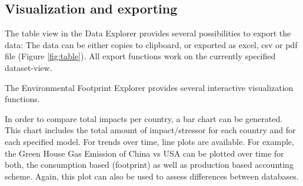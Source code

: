 \subsection{Visualization and exporting}

The table view in the Data Explorer provides several possibilities to export the data: The data can be either copies to clipboard, or exported as excel, csv or pdf file (Figure \ref{fig:table}). All export functions work on the currently specified dataset-view. 

The Environmental Footprint Explorer provides several interactive visualization functions. 

In order to compare total impacts per country, a bar chart can be generated. This chart includes the total amount of impact/stressor for each country and for each specified model. For trends over time, line plots are available. 
For example, the Green House Gas Emission of China vs USA can be plotted over time for both, the consumption based (footprint) as well as production based accounting scheme. Again, this plot can also be used to assess differences between databases.

